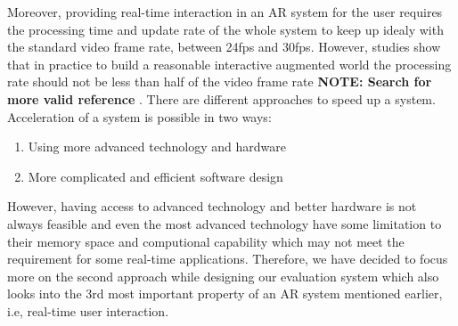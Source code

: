 \documentclass[dvips,letterpaper,12pt]{report}
\begin{document}
Moreover, providing real-time interaction in an AR system for the user requires the processing time and update rate of the whole system to keep up idealy with the standard video frame rate, 
between 24fps and 
30fps. However, studies show that in practice to build a reasonable interactive augmented world the processing rate should not be less than half of the video frame rate  \textbf{NOTE: Search for more
valid reference} \cite{spe}. 
There are different approaches to speed up a system. Acceleration of a system is possible in two ways:
\begin{enumerate}
\item Using more advanced technology and hardware
\item More complicated and efficient software design
\end{enumerate}
However, having access to advanced technology and better hardware is not always feasible and even the most advanced technology have some limitation to their memory space and computional capability
which may not meet the requirement for some real-time applications. 
Therefore, we have decided to focus more on the second approach while designing our evaluation system which also looks into the 3rd most important property of
an AR system mentioned earlier, i.e, real-time user interaction. \newline 
\end{document}
